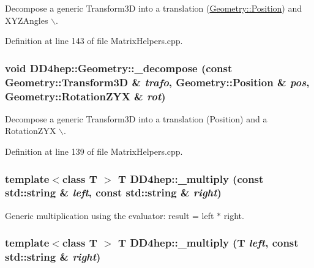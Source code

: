 Decompose a generic Transform3D into a translation (\hyperlink{namespace_d_d4hep_1_1_geometry_a55083902099d03506c6db01b80404900}{Geometry::Position}) and XYZAngles $\backslash$. 

Definition at line 143 of file MatrixHelpers.cpp.\hypertarget{group___d_d4_h_e_p___g_e_o_m_e_t_r_y_ga9bb962c6fc39a0f8fc76420e08d24c7a}{
\subsubsection[{\_\-decompose}]{\setlength{\rightskip}{0pt plus 5cm}void DD4hep::Geometry::\_\-decompose (const Geometry::Transform3D \& {\em trafo}, \/  Geometry::Position \& {\em pos}, \/  Geometry::RotationZYX \& {\em rot})}}
\label{group___d_d4_h_e_p___g_e_o_m_e_t_r_y_ga9bb962c6fc39a0f8fc76420e08d24c7a}


Decompose a generic Transform3D into a translation (Position) and a RotationZYX $\backslash$. 

Definition at line 139 of file MatrixHelpers.cpp.\hypertarget{group___d_d4_h_e_p___g_e_o_m_e_t_r_y_ga4ae64d76e210fc978cb9e1e77db06963}{
\subsubsection[{\_\-multiply}]{\setlength{\rightskip}{0pt plus 5cm}template$<$class T $>$ {\bf T} DD4hep::\_\-multiply (const std::string \& {\em left}, \/  const std::string \& {\em right})}}
\label{group___d_d4_h_e_p___g_e_o_m_e_t_r_y_ga4ae64d76e210fc978cb9e1e77db06963}


Generic multiplication using the evaluator: result = left $\ast$ right. \hypertarget{group___d_d4_h_e_p___g_e_o_m_e_t_r_y_gac4300175672d8d262ea612b09ea1360e}{
\subsubsection[{\_\-multiply}]{\setlength{\rightskip}{0pt plus 5cm}template$<$class T $>$ {\bf T} DD4hep::\_\-multiply ({\bf T} {\em left}, \/  const std::string \& {\em right})}}
\label{group___d_d4_h_e_p___g_e_o_m_e_t_r_y_gac4300175672d8d262ea612b09ea1360e}


